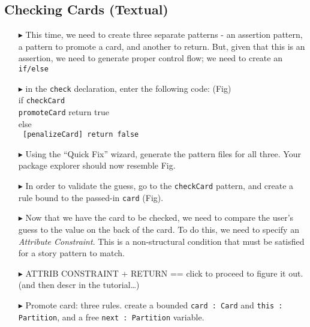 \newpage
\subsection{Checking Cards (Textual)}
\texHeader
\hypertarget{checkCard tex}{}

 
 \texttt{}
 \emph{}
 
 \begin{itemize}
   
\item[$\blacktriangleright$] This time, we need to create three separate patterns - an assertion pattern, a pattern to promote a card, and another to return.
But, given that this is an assertion, we need to generate proper control flow; we need to create an \texttt{if/else}

\item[$\blacktriangleright$] in the \texttt{check} declaration, enter the following code: (Fig) \\ 
if \texttt{checkCard}  { \\ \texttt{promoteCard} return true \\ } else \\ \texttt{ [penalizeCard] return false} \\

\item[$\blacktriangleright$] Using the ``Quick Fix'' wizard, generate the pattern files for all three. Your package explorer should now resemble Fig.

\item[$\blacktriangleright$] In order to validate the guess, go to the \texttt{checkCard} pattern, and create a rule bound to the passed-in \texttt{card} (Fig).

\item[$\blacktriangleright$] Now that we have the card to be checked, we need to compare the user's guess to the value on the back of the card. To do this, we
need to specify an \emph{Attribute Constraint}. This is a non-structural condition that must be satisfied for a story pattern to match.

\item[$\blacktriangleright$] ATTRIB CONSTRAINT + RETURN == click to proceed to figure it out. (and then descr in the tutorial\ldots)

\item[$\blacktriangleright$] Promote card: three rules. create a bounded \texttt{card : Card} and  \texttt{this : Partition}, and a free  \texttt{next :
Partition} variable.


\end{itemize}
